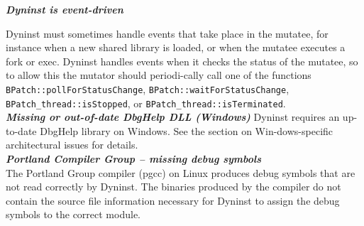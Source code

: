 \documentclass[twopages,a4paper]{article}
\begin{document}
\emph{\textbf{Dyninst is event-driven}}

Dyninst must sometimes handle events that take place in the mutatee, for instance when a new shared library is loaded, or when the mutatee executes a fork or exec. Dyninst handles events when it checks the status of the mutatee, so to allow this the mutator should periodi-cally call one of the functions \texttt{BPatch::pollForStatusChange}, \texttt{BPatch::waitForStatusChange}, \texttt{BPatch\_thread::isStopped}, or \texttt{BPatch\_thread::isTerminated}.\\

\emph{\textbf{Missing or out-of-date DbgHelp DLL (Windows)}}
	Dyninst requires an up-to-date DbgHelp library on Windows.  See the section on Win-dows-specific architectural issues for details.\\
	
\emph{\textbf{Portland Compiler Group – missing debug symbols}}
\\
	The Portland Group compiler (pgcc) on Linux produces debug symbols that are not read correctly by Dyninst.  The binaries produced by the compiler do not contain the source file information necessary for Dyninst to assign the debug symbols to the correct module.


\printindex[terms]

\pagebreak



\end{document}
